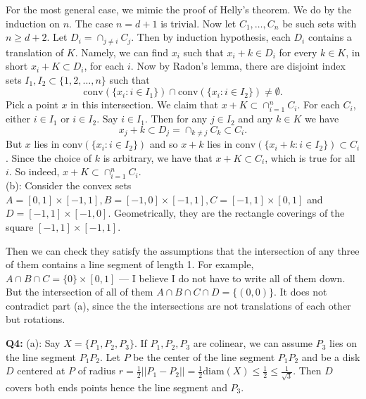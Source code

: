 \documentclass[12pt,reqno]{amsart}
\theoremstyle{definition}
\newcommand{\conv}[1]{\mathrm{conv}(#1)}
\newcommand{\diam}[1]{\mathrm{diam}(#1)}
\begin{document}
For the most general case, we mimic the proof of Helly's theorem. We do by the induction on $n$. The case $n=d+1$ is trivial. Now let $C_1,\dots, C_n$ be such sets with $n\geq d+2$. Let $D_i=\cap_{j\not=i} C_j$. Then by induction hypothesis, each $D_i$ contains a translation of $K$. Namely, we can find $x_i$ such that $x_i+k\in D_i$ for every $k\in K$, in short $x_i+K\subset D_i$, for each $i$. Now by Radon's lemma, there are disjoint index sets $I_1,I_2\subset \{1,2,\dots, n\}$ such that $$\conv{\{x_i: i\in I_1\}}\cap \conv{\{x_i: i\in I_2\}}\not=\emptyset.$$
Pick a point $x$ in this intersection. We claim that $x+K \subset \cap_{i=1}^n C_i$. For each $C_i$, either $i\in I_1$ or $i\in I_2$. Say $i\in I_1$. Then for any $j\in I_2$ and any $k\in K$ we have $$x_j+k \subset D_j = \cap_{k\not=j} C_k \subset C_i.$$ But $x$ lies in $\conv{\{x_i: i\in I_2\}}$ and so $x+k$ lies in $\conv{\{x_i+k: i\in I_2\}}\subset C_i$. Since the choice of $k$ is arbitrary, we have that $x+K\subset C_i$, which is true for all $i$. So indeed, $x+K\subset \cap_{i=1}^n C_i$.\\


(b): Consider the convex sets $A=[0,1]\times [-1,1], B=[-1,0]\times [-1,1], C=[-1,1]\times [0,1]$ and $D=[-1,1]\times [-1,0]$. Geometrically, they are the rectangle coverings of the square $[-1,1]\times [-1,1]$.
\begin{center}
\end{center}

Then we can check they satisfy the assumptions that the intersection of any three of them contains a line segment of length 1. For example, $A\cap B\cap C= \{0\}\times [0,1]$ --- I believe I do not have to write all of them down. But the intersection of all of them $A\cap B\cap C\cap D = \{(0,0)\}$.
It does not contradict part (a), since the the intersections are not translations of each other but rotations.

\newpage

\noindent \textbf{Q4:} (a): Say $X=\{P_1,P_2,P_3\}$. If $P_1, P_2, P_3$ are colinear, we can assume $P_3$ lies on the line segment $P_1P_2$. Let $P$ be the center of the line segment $P_1P_2$ and be a disk $D$ centered at $P$ of radius $r = \frac{1}{2} ||P_1-P_2|| = \frac{1}{2}\diam{X} \leq \frac{1}{2} \leq \frac{1}{\sqrt{3}}$. Then $D$ covers both ends points hence the line segment and $P_3$.
\end{document}
